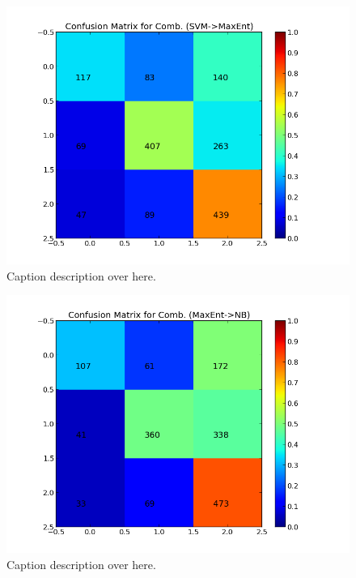\begin{minipage}[c]{\linewidth}
     \begin{minipage}{0.45\linewidth}
          \begin{figure}[H]
               \includegraphics[width=\linewidth]{../img/plots/grid/confusion_matrix_Comb-SVM-MaxEnt.png}
           \caption[Results overview across models]{Caption description over here.}
           \label{fig:confmat_svm_maxent}
          \end{figure}
     \end{minipage}
     \hspace{0.05\linewidth}
     \begin{minipage}{0.45\linewidth}
          \begin{figure}[H]
               \includegraphics[width=\linewidth]{../img/plots/grid/confusion_matrix_Comb-MaxEnt-NB.png}
           \caption[Results overview across models]{Caption description over here.}
           \label{fig:confmat_maxent_nb}
          \end{figure}
     \end{minipage}   \\
         


\end{minipage}
